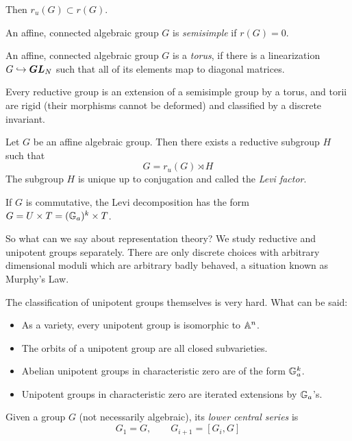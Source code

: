 Then $r_u(G) \subset r(G)$.

\begin{defn}
An affine, connected algebraic group $G$ is \emph{semisimple} if $r(G) = 0$.
\end{defn}
\begin{defn}[Torus]
An affine, connected algebraic group $G$ is a \emph{torus}, if there is a linearization $G \hookrightarrow \boldsymbol{GL}_N$ such that all of its elements map to diagonal matrices.
\end{defn}

\begin{prop}
Every reductive group is an extension of a semisimple group by a torus, and torii are rigid (their morphisms cannot be deformed) and classified by a discrete invariant.
\end{prop}

\begin{thm}
Let $G$ be an affine algebraic group. Then there exists a reductive subgroup $H$ such that
\[
G = r_u(G) \rtimes H
\]
The subgroup $H$ is unique up to conjugation and called the \emph{Levi factor}.
\end{thm}

\begin{exam}
If $G$ is commutative, the Levi decomposition has the form $G = U \times T = (\mathbb{G}_a)^k \times T$.
\end{exam}
\noindent So what can we say about representation theory? We study reductive and unipotent groups separately. There are only discrete choices with arbitrary dimensional moduli which are arbitrary badly behaved, a situation known as Murphy's Law.

The classification of unipotent groups themselves is very hard. What can be said:

\begin{itemize}
\item As a variety, every unipotent group is isomorphic to $\mathbb{A}^n$. 
\item The orbits of a unipotent group are all closed subvarieties.
\item Abelian unipotent groups in characteristic zero are of the form $\mathbb{G}_a^k$.
\item Unipotent groups in characteristic zero are iterated extensions by $\mathbb{G}_a$'s.
\end{itemize}

\begin{defn}
Given a group $G$ (not necessarily algebraic), its \emph{lower central series} is
\[
G_1 = G, \qquad G_{i+1} = [G_i, G]
\]
\end{defn}

